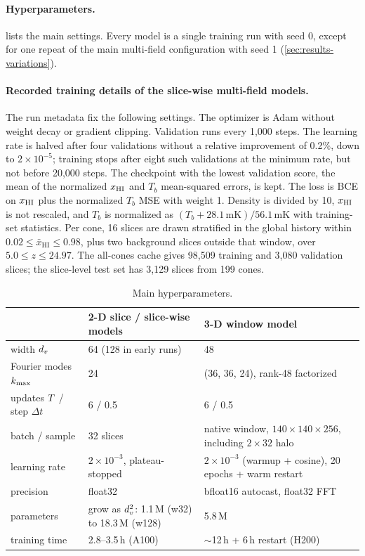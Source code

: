 \paragraph{Hyperparameters.}  lists the main settings. Every model is a single training run with seed 0, except for one repeat of the main multi-field configuration with seed 1 (\cref{sec:results-variations}).

\paragraph{Recorded training details of the slice-wise multi-field models.} The run metadata fix the following settings. The optimizer is Adam without weight decay or gradient clipping. Validation runs every 1,000 steps. The learning rate is halved after four validations without a relative improvement of 0.2\%, down to $2\times10^{-5}$; training stops after eight such validations at the minimum rate, but not before 20,000 steps. The checkpoint with the lowest validation score, the mean of the normalized $x_{\mathrm{HI}}$ and $T_b$ mean-squared errors, is kept. The loss is BCE on $x_{\mathrm{HI}}$ plus the normalized $T_b$ MSE with weight 1. Density is divided by 10, $x_{\mathrm{HI}}$ is not rescaled, and $T_b$ is normalized as $(T_b+28.1\,\mathrm{mK})/56.1\,\mathrm{mK}$ with training-set statistics. Per cone, 16 slices are drawn stratified in the global history within $0.02\le\bar x_{\mathrm{HI}}\le0.98$, plus two background slices outside that window, over $5.0\le z\le24.97$. The all-cones cache gives 98,509 training and 3,080 validation slices; the slice-level test set has 3,129 slices from 199 cones.

\begin{table}[!tp]
  \centering
  \caption{Main hyperparameters.}
  \label{tab:hyperparameters}
  \small
  \begin{tabular}{@{}p{3.6cm}p{5.0cm}p{5.4cm}@{}}
    \toprule
    & 2-D slice / slice-wise models & 3-D window model \\
    \midrule
    width $d_v$ & 64 (128 in early runs) & 48 \\
    Fourier modes $k_{\max}$ & 24 & (36, 36, 24), rank-48 factorized \\
    updates $T$ / step $\Delta t$ & 6 / 0.5 & 6 / 0.5 \\
    batch / sample & 32 slices & native window, $140\times140\times256$, including $2\times32$ halo \\
    learning rate & $2\times10^{-3}$, plateau-stopped & $2\times10^{-3}$ (warmup + cosine), 20 epochs + warm restart \\
    precision & float32 & bfloat16 autocast, float32 FFT \\
    parameters & grow as $d_v^2$: 1.1\,M (w32) to 18.3\,M (w128) & 5.8\,M \\
    training time & 2.8--3.5\,h (A100) & $\sim$12\,h + 6\,h restart (H200) \\
    \bottomrule
  \end{tabular}
\end{table}

